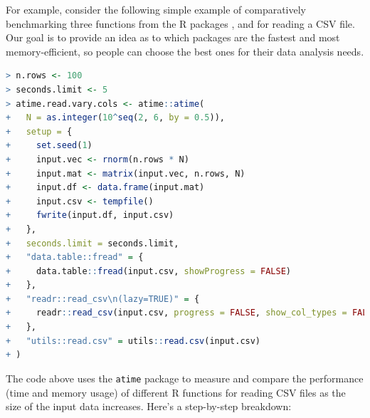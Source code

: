 \noindent For example, consider the following simple example of comparatively benchmarking three functions from the R packages ,  and  for reading a CSV file. Our goal is to provide an idea as to which packages are the fastest and most memory-efficient, so people can choose the best ones for their data analysis needs.\\

\begin{lstlisting}[language=R]
> n.rows <- 100
> seconds.limit <- 5
> atime.read.vary.cols <- atime::atime(
+   N = as.integer(10^seq(2, 6, by = 0.5)),
+   setup = {
+     set.seed(1)
+     input.vec <- rnorm(n.rows * N)
+     input.mat <- matrix(input.vec, n.rows, N)
+     input.df <- data.frame(input.mat)
+     input.csv <- tempfile()
+     fwrite(input.df, input.csv)
+   },
+   seconds.limit = seconds.limit,
+   "data.table::fread" = {
+     data.table::fread(input.csv, showProgress = FALSE)
+   },
+   "readr::read_csv\n(lazy=TRUE)" = {
+     readr::read_csv(input.csv, progress = FALSE, show_col_types = FALSE, lazy = TRUE)
+   },
+   "utils::read.csv" = utils::read.csv(input.csv)
+ )
\end{lstlisting}

The code above uses the \texttt{atime} package to measure and compare the performance (time and memory usage) of different R functions for reading CSV files as the size of the input data increases. Here's a step-by-step breakdown:

